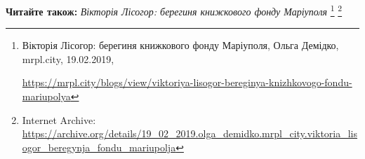  
 
 
 
 

\textbf{Читайте також:} \emph{Вікторія Лісогор: берегиня книжкового фонду Маріуполя}%
\footnote{Вікторія Лісогор: берегиня книжкового фонду Маріуполя, Ольга Демідко, mrpl.city, 19.02.2019, \par%
\url{https://mrpl.city/blogs/view/viktoriya-lisogor-bereginya-knizhkovogo-fondu-mariupolya}
} %
\footnote{Internet Archive: \url{https://archive.org/details/19_02_2019.olga_demidko.mrpl_city.viktoria_lisogor_beregynja_fondu_mariupolja}}

